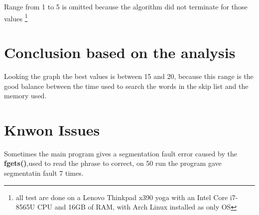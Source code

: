 \newline
Range from 1 to 5 is omitted because the algorithm did not terminate for those values
\footnote{all test are done on a Lenovo Thinkpad x390 yoga with an Intel Core i7-8565U CPU and 16GB of RAM, with Arch Linux installed as only OS}


\section{Conclusion based on the analysis}
Looking the graph the best values is between 15 and 20, because this range is the good balance between the time used to search the words in the skip list and the memory used. 

\section{Knwon Issues}
Sometimes the main program gives a segmentation fault error caused by the \textbf{fgets()},used to read the phrase to correct, on 50 run the program gave segmentatin fault 7 times.